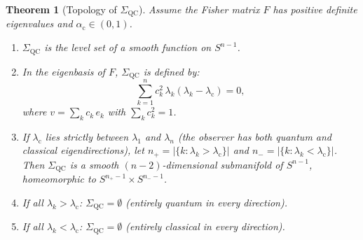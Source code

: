 \documentclass[11pt,a4paper]{article}
\theoremstyle{plain}
\newtheorem{theorem}{Theorem}[section]
\theoremstyle{definition}
\newcommand{\Sn}{S^{n-1}}
\newcommand{\SigmaQC}{\Sigma_{\mathrm{QC}}}
\newcommand{\alphac}{\alpha_{\mathrm{c}}}
\newcommand{\lamc}{\lambda_{\mathrm{c}}}
\begin{document}
\begin{theorem}[Topology of $\SigmaQC$]
\label{thm:sigma_topology}
Assume the Fisher matrix $F$ has positive definite eigenvalues and
$\alphac \in (0,1)$.
\begin{enumerate}[label=(\alph*)]
\item $\SigmaQC$ is the level set of a smooth function on $\Sn$.

\item In the eigenbasis of $F$, $\SigmaQC$ is defined by:
\begin{equation}
\label{eq:sigma_equation}
\sum_{k=1}^n c_k^2\,\lambda_k(\lambda_k - \lamc) = 0,
\end{equation}
where $v = \sum_k c_k\, e_k$ with $\sum_k c_k^2 = 1$.

\item If $\lamc$ lies strictly between $\lambda_1$ and $\lambda_n$
(the observer has both quantum and classical eigendirections),
let $n_+ = |\{k : \lambda_k > \lamc\}|$ and
$n_- = |\{k : \lambda_k < \lamc\}|$.  Then $\SigmaQC$ is a
smooth $(n-2)$-dimensional submanifold of $\Sn$, homeomorphic to
$S^{n_+-1} \times S^{n_--1}$.

\item If all $\lambda_k > \lamc$: $\SigmaQC = \emptyset$ (entirely
quantum in every direction).

\item If all $\lambda_k < \lamc$: $\SigmaQC = \emptyset$ (entirely
classical in every direction).
\end{enumerate}
\end{theorem}
\end{document}
